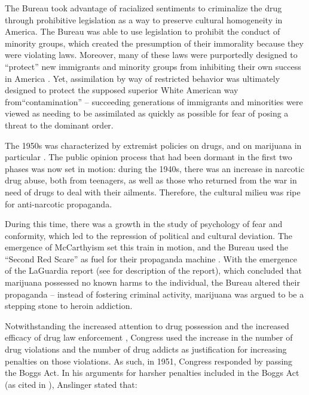 The Bureau took advantage of racialized sentiments to criminalize the drug through prohibitive legislation as a way to preserve cultural homogeneity in America. The Bureau was able to use legislation to prohibit the conduct of minority groups, which created the presumption of their immorality because they were violating laws. Moreover, many of these laws were purportedly designed to ``protect'' new immigrants and minority groups from inhibiting their own success in America \citep{bonnie_and_whitebread_1970}.  Yet, assimilation by way of restricted behavior was ultimately designed to protect the supposed superior White American way from``contamination'' -- succeeding generations of immigrants and minorities were viewed as needing to be assimilated as quickly as possible for fear of posing a threat to the dominant order.


The 1950s was characterized by extremist policies on drugs, and on marijuana in particular \citep{bonnie_and_whitebread_1970}. The public opinion process that had been dormant in the first two phases was now set in motion: during the 1940s, there was an increase in narcotic drug abuse, both from teenagers, as well as those who returned from the war in need of drugs to deal with their ailments. Therefore, the cultural milieu was ripe for anti-narcotic propaganda. 

During this time, there was a growth in the study of psychology of fear and conformity, which led to the repression of political and cultural deviation. The emergence of McCarthyism set this train in motion, and the Bureau used the ``Second Red Scare'' as fuel for their propaganda machine \citep{bonnie_and_whitebread_1970}. With the emergence of the LaGuardia report (see \citealt{newhart_and_dolphin_2018} for description of the report), which concluded that marijuana possessed no known harms to the individual, the Bureau altered their propaganda --  instead of fostering criminal activity, marijuana was argued to be a stepping stone to heroin addiction. 


Notwithstanding the increased attention to drug possession and the increased efficacy of drug law enforcement \citep{anslinger_1951}, Congress used the increase in the number of drug violations and the number of drug addicts as justification for increasing penalties on those violations. As such, in 1951, Congress responded by passing the Boggs Act. In his arguments for harsher penalties included in the Boggs Act (as cited in \citealt{bonnie_and_whitebread_1970}), Anslinger stated that:


